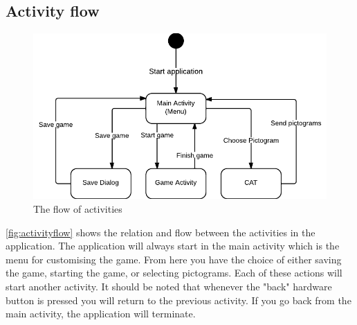 \subsection*{Activity flow}
\begin{figure}[H]
\centering
\includegraphics[width=0.9\linewidth]{img/activityflow.pdf}
\caption{The flow of activities}
\label{fig:activityflow}
\end{figure}
\autoref{fig:activityflow} shows the relation and flow between the activities in the application.
The application will always start in the main activity which is the menu for customising the game. From here you have the choice of either saving the game, starting the game, or selecting pictograms. Each of these actions will start another activity.
It should be noted that whenever the "back" hardware button is pressed you will return to the previous activity. If you go back from the main activity, the application will terminate.
